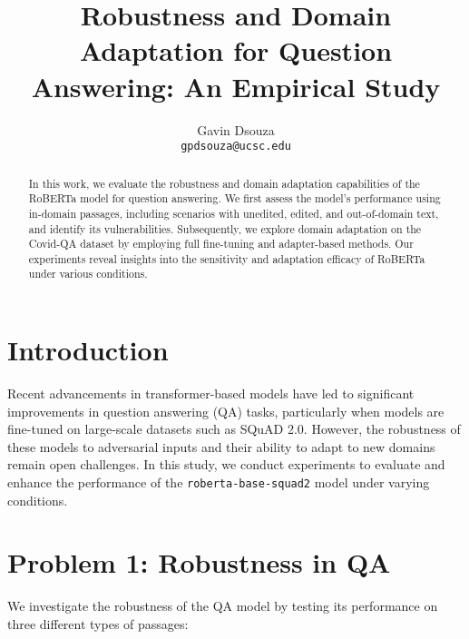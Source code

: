\documentclass[11pt]{article}
\title{Robustness and Domain Adaptation for Question Answering: An Empirical Study}
\author{Gavin Dsouza \\
  \texttt{gpdsouza@ucsc.edu}}
\begin{document}
\maketitle

\begin{abstract}
In this work, we evaluate the robustness and domain adaptation capabilities of the RoBERTa model for question answering. We first assess the model's performance using in-domain passages, including scenarios with unedited, edited, and out-of-domain text, and identify its vulnerabilities. Subsequently, we explore domain adaptation on the Covid-QA dataset by employing full fine-tuning and adapter-based methods. Our experiments reveal insights into the sensitivity and adaptation efficacy of RoBERTa under various conditions.
\end{abstract}

\section{Introduction}
Recent advancements in transformer-based models have led to significant improvements in question answering (QA) tasks, particularly when models are fine-tuned on large-scale datasets such as SQuAD 2.0. However, the robustness of these models to adversarial inputs and their ability to adapt to new domains remain open challenges. In this study, we conduct experiments to evaluate and enhance the performance of the \texttt{roberta-base-squad2} model under varying conditions.

\section{Problem 1: Robustness in QA}
We investigate the robustness of the QA model by testing its performance on three different types of passages:
\end{document}
